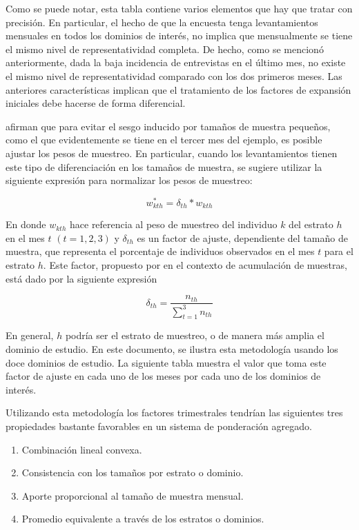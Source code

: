 \documentclass[
  10pt,
  spanish,
]{book}
\providecommand{\tightlist}{%
  \setlength{\itemsep}{0pt}\setlength{\parskip}{0pt}}
\begin{document}
Como se puede notar, esta tabla contiene varios elementos que hay que
tratar con precisión. En particular, el hecho de que la encuesta tenga
levantamientos mensuales en todos los dominios de interés, no
implica que mensualmente se tiene el mismo nivel de representatividad completa. De hecho, como se mencionó anteriormente, dada la baja incidencia de entrevistas en el último mes, no existe el mismo nivel de representatividad comparado con los dos primeros meses. Las anteriores características implican que el tratamiento de
los factores de expansión iniciales debe hacerse de forma diferencial.

\citet{Heeringa_West_Berglund_2017} afirman que para evitar el sesgo inducido
por tamaños de muestra pequeños, como el que evidentemente se tiene en
el tercer mes del ejemplo, es posible ajustar los pesos de
muestreo. En particular, cuando los levantamientos tienen este tipo de diferenciación en los tamaños de muestra, se sugiere utilizar la siguiente
expresión para normalizar los pesos de muestreo:

\[
w_{kth}^{*}=\delta_{th}*w_{kth}
\]

En donde \(w_{kth}\) hace referencia al peso de muestreo del individuo \(k\)
del estrato \(h\) en el mes \(t\) \((t=1, 2, 3)\) y \(\delta_{th}\) es un factor
de ajuste, dependiente del tamaño de muestra, que representa el
porcentaje de individuos observados en el mes \(t\) para el estrato \(h\).
Este factor, propuesto por \citet[p.~131]{Kish_1999} en el contexto de
acumulación de muestras, está dado por la siguiente expresión

\[
\delta_{th} = \frac{n_{th}}{\sum_{t = 1} ^3 n_{th}}
\]

En general, \(h\) podría ser el estrato de muestreo, o de manera más
amplia el dominio de estudio. En este documento, se ilustra esta
metodología usando los doce dominios de estudio. La siguiente tabla
muestra el valor que toma este factor de ajuste en cada uno de los meses
por cada uno de los dominios de interés.

Utilizando esta metodología los factores trimestrales tendrían las
siguientes tres propiedades bastante favorables en un sistema de
ponderación agregado.

\begin{enumerate}
\def\labelenumi{\arabic{enumi}.}
\tightlist
\item
  Combinación lineal convexa.
\item
  Consistencia con los tamaños por estrato o dominio.
\item
  Aporte proporcional al tamaño de muestra mensual.
\item
  Promedio equivalente a través de los estratos o dominios.
\end{enumerate}
\end{document}
